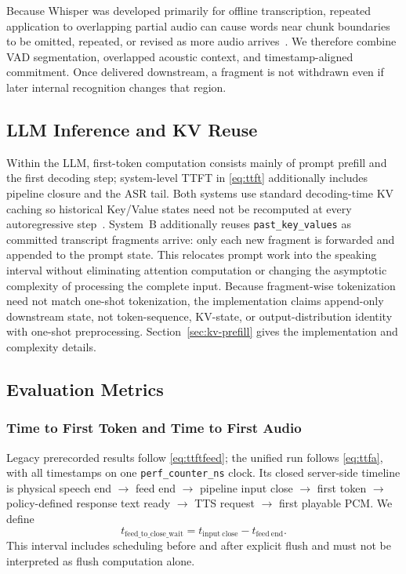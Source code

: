 \documentclass[conference]{IEEEtran}
\begin{document}
Because Whisper was developed primarily for offline transcription, repeated application to overlapping partial audio can cause words near chunk boundaries to be omitted, repeated, or revised as more audio arrives~\cite{liu2020partialhypothesis,machacek2023turning}. We therefore combine VAD segmentation, overlapped acoustic context, and timestamp-aligned commitment. Once delivered downstream, a fragment is not withdrawn even if later internal recognition changes that region.

\subsection{LLM Inference and KV Reuse}

Within the LLM, first-token computation consists mainly of prompt prefill and the first decoding step; system-level TTFT in \eqref{eq:ttft} additionally includes pipeline closure and the ASR tail. Both systems use standard decoding-time KV caching so historical Key/Value states need not be recomputed at every autoregressive step~\cite{ref4,kwon2023pagedattention}. System~B additionally reuses \texttt{past\_key\_values} as committed transcript fragments arrive: only each new fragment is forwarded and appended to the prompt state. This relocates prompt work into the speaking interval without eliminating attention computation or changing the asymptotic complexity of processing the complete input. Because fragment-wise tokenization need not match one-shot tokenization, the implementation claims append-only downstream state, not token-sequence, KV-state, or output-distribution identity with one-shot preprocessing. Section~\ref{sec:kv-prefill} gives the implementation and complexity details.

\subsection{Evaluation Metrics}

\subsubsection{Time to First Token and Time to First Audio}

Legacy prerecorded results follow \eqref{eq:ttftfeed}; the unified run follows \eqref{eq:ttfa}, with all timestamps on one \texttt{perf\_counter\_ns} clock. Its closed server-side timeline is physical speech end $\rightarrow$ feed end $\rightarrow$ pipeline input close $\rightarrow$ first token $\rightarrow$ policy-defined response text ready $\rightarrow$ TTS request $\rightarrow$ first playable PCM. We define
\begin{equation}
t_{\mathrm{feed\_to\_close\_wait}}=t_{\mathrm{input\ close}}-t_{\mathrm{feed\ end}}.
\label{eq:feedclose}
\end{equation}
This interval includes scheduling before and after explicit flush and must not be interpreted as flush computation alone.
\end{document}
